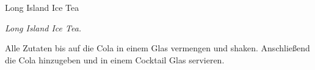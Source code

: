 \begin{recipe}{Long Island Ice Tea}{}{}

  \freeform
  \textit{Long Island Ice Tea.}


  Alle Zutaten bis auf die Cola in einem Glas vermengen und shaken.
  Anschließend die Cola hinzugeben und in einem Cocktail Glas servieren.

  \freeform
  \hrulefill

\end{recipe}
